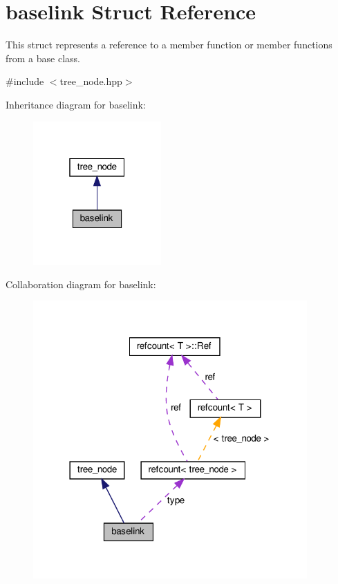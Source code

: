 \hypertarget{structbaselink}{}\section{baselink Struct Reference}
\label{structbaselink}


This struct represents a reference to a member function or member functions from a base class.  




{\ttfamily \#include $<$tree\+\_\+node.\+hpp$>$}



Inheritance diagram for baselink\+:
\nopagebreak
\begin{figure}[H]
\begin{center}
\leavevmode
\includegraphics[width=139pt]{d9/d39/structbaselink__inherit__graph}
\end{center}
\end{figure}


Collaboration diagram for baselink\+:
\nopagebreak
\begin{figure}[H]
\begin{center}
\leavevmode
\includegraphics[width=297pt]{d6/da6/structbaselink__coll__graph}
\end{center}
\end{figure}
